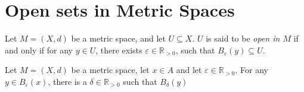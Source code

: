 \section{Open sets in Metric Spaces}


\begin{definition}
	Let $M = (X, d)$ be a metric space, and let $U \subseteq X$. $U$ is said to be \textit{open in $M$} if and only if for any $y \in U$, there exists $\varepsilon \in \mathbb R_{> 0}$, such that $B_\varepsilon(y) \subseteq U$.
\end{definition}

\begin{lemma}
	Let $M = (X, d)$ be a metric space, let $x \in A$ and let $\varepsilon \in \mathbb R_{> 0}$. For any $y \in B_\varepsilon (x)$, there is a $\delta \in \mathbb R_{> 0}$ such that $B_\delta (y)$
\end{lemma}












































%